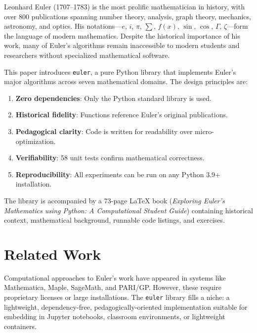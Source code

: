 \documentclass[11pt,a4paper]{article}
\theoremstyle{definition}
\begin{document}
Leonhard Euler (1707--1783) is the most prolific mathematician in history, with over 800 publications spanning number theory, analysis, graph theory, mechanics, astronomy, and optics. His notations---$e$, $i$, $\pi$, $\sum$, $f(x)$, $\sin$, $\cos$, $\Gamma$, $\zeta$---form the language of modern mathematics. Despite the historical importance of his work, many of Euler's algorithms remain inaccessible to modern students and researchers without specialized mathematical software.

This paper introduces \texttt{euler}, a pure Python library that implements Euler's major algorithms across seven mathematical domains. The design principles are:

\begin{enumerate}
    \item \textbf{Zero dependencies}: Only the Python standard library is used.
    \item \textbf{Historical fidelity}: Functions reference Euler's original publications.
    \item \textbf{Pedagogical clarity}: Code is written for readability over micro-optimization.
    \item \textbf{Verifiability}: 58 unit tests confirm mathematical correctness.
    \item \textbf{Reproducibility}: All experiments can be run on any Python 3.9+ installation.
\end{enumerate}

The library is accompanied by a 73-page LaTeX book (\emph{Exploring Euler's Mathematics using Python: A Computational Student Guide}) containing historical context, mathematical background, runnable code listings, and exercises.

\section{Related Work}
Computational approaches to Euler's work have appeared in systems like Mathematica, Maple, SageMath, and PARI/GP. However, these require proprietary licenses or large installations. The \texttt{euler} library fills a niche: a lightweight, dependency-free, pedagogically-oriented implementation suitable for embedding in Jupyter notebooks, classroom environments, or lightweight containers.
\end{document}
